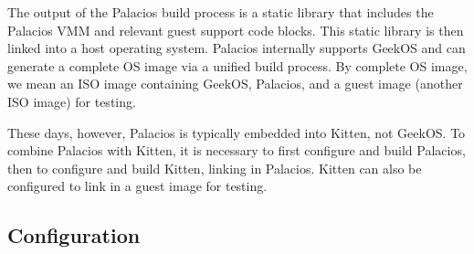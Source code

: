 \documentclass[11pt]{article}
\begin{document}
The output of the Palacios build process is a static library that
includes the Palacios VMM and relevant guest support code blocks. This
static library is then linked into a host operating system. Palacios
internally supports GeekOS and can generate a complete OS image via a
unified build process.  By complete OS image, we mean an ISO image
containing GeekOS, Palacios, and a guest image (another ISO image) for
testing. 

These days, however, Palacios is typically embedded into Kitten, not
GeekOS.  To combine Palacios with Kitten, it is necessary to first
configure and build Palacios, then to configure and build Kitten,
linking in Palacios.   Kitten can also be configured to link in a
guest image for testing.  

\subsection{Configuration}
\end{document}

